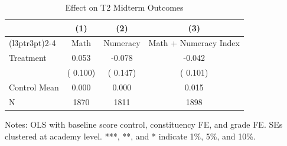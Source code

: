\begin{table}[!htbp]
\centering
\caption{Effect on T2 Midterm Outcomes}
\label{tab:ng_t2_mte}
\begin{threeparttable}
\begin{tabular}[t]{lccc}
\toprule
 & (1) & (2) & (3) \\
\cmidrule(l{3pt}r{3pt}){2-4}
 & Math & Numeracy & Math + Numeracy Index \\
\midrule
Treatment &   0.053 &  -0.078 &  -0.042 \\
 & (  0.100) & (  0.147) & (  0.101) \\
\addlinespace
Control Mean &   0.000 &   0.000 &   0.015 \\
N & 1870 & 1811 & 1898 \\
\bottomrule
\end{tabular}
\begin{tablenotes}[para]
\item Notes: OLS with baseline score control, constituency FE, and grade FE. 
SEs clustered at academy level. ***, **, and * indicate 1\%, 5\%, and 10\%.
\end{tablenotes}
\end{threeparttable}
\end{table}
